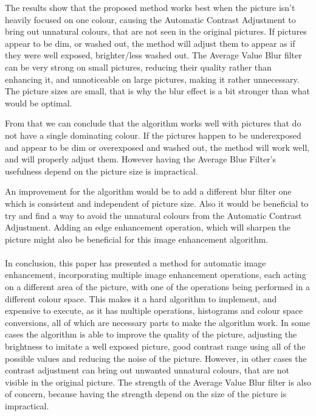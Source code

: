 \documentclass[journal,transmag]{IEEEtran}
\begin{document}
The results show that the proposed method works best when the picture isn't heavily focused on one colour, causing the Automatic Contrast Adjustment to bring out unnatural colours, that are not seen in the original pictures. If pictures appear to be dim, or washed out, the method will adjust them to appear as if they were well exposed, brighter/less washed out. 
The Average Value Blur filter can be very strong on small pictures, reducing their quality rather than enhancing it, and unnoticeable on large pictures, making it rather unnecessary. The picture sizes are small, that is why the blur effect is a bit stronger than what would be optimal.

From that we can conclude that the algorithm works well with pictures that do not have a single dominating colour. If the pictures happen to be underexposed and appear to be dim or overexposed and washed out, the method will work well, and will properly adjust them. However having the Average Blue Filter's usefulness depend on the picture size is impractical. 

An improvement for the algorithm would be to add a different blur filter one which is consistent and independent of picture size. Also it would be beneficial to try and find a way to avoid the unnatural colours from the Automatic Contrast Adjustment. Adding an edge enhancement operation, which will sharpen the picture might also be beneficial for this image enhancement algorithm. %
\\
\\
In conclusion, this paper has presented a method for automatic image enhancement, incorporating multiple image enhancement operations, each acting on a different area of the picture, with one of the operations being performed in a different colour space. This makes it a hard algorithm to implement, and expensive to execute, as it has multiple operations, histograms and colour space conversions, all of which are necessary parts to make the algorithm work. In some cases the algorithm is able to improve the quality of the picture, adjusting the brightness to imitate a well exposed picture, good contrast range using all of the possible values and reducing the noise of the picture. However, in other cases the contrast adjustment can bring out unwanted unnatural colours, that are not visible in the original picture. The strength of the Average Value Blur filter is also of concern, because having the strength depend on the size of the picture is impractical.





\end{document}
